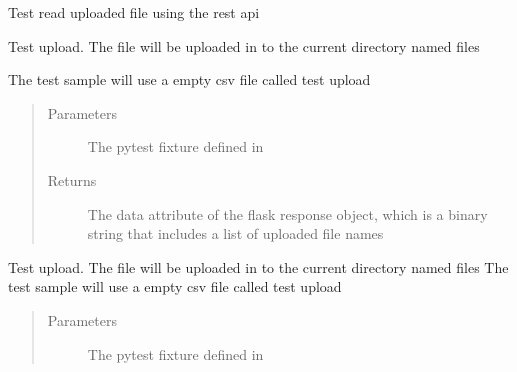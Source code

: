\documentclass[letterpaper,10pt,english]{sphinxmanual}
\begin{document}
\begin{fulllineitems}
\begin{fulllineitems}
\label{\detokenize{tests:tests.test_cloudmesh.TestFileOperations.test_read}}
Test read uploaded file using the rest api

\end{fulllineitems}


\begin{fulllineitems}
\label{\detokenize{tests:tests.test_cloudmesh.TestFileOperations.test_success_upload}}
Test upload. The file will be uploaded in to the current directory named files

The test sample will use a empty csv file called test upload
\begin{quote}\begin{description}
\item[{Parameters}] \leavevmode
{} \textendash{} The pytest fixture defined in {\hyperref[\detokenize{tests:module-tests.conftest}]{}}

\item[{Returns}] \leavevmode
The data attribute of the flask response object, which is a binary string that includes a list of uploaded
file names

\end{description}\end{quote}

\end{fulllineitems}


\begin{fulllineitems}
\label{\detokenize{tests:tests.test_cloudmesh.TestFileOperations.test_success_upload_dabetes}}
Test upload. The file will be uploaded in to the current directory named files
The test sample will use a empty csv file called test upload
\begin{quote}\begin{description}
\item[{Parameters}] \leavevmode
{} \textendash{} The pytest fixture defined in {\hyperref[\detokenize{tests:module-tests.conftest}]{}}


\end{description}
\end{quote}
\end{fulllineitems}
\end{fulllineitems}
\end{document}
